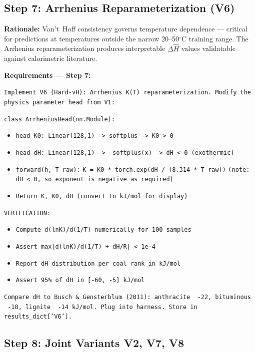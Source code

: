 \documentclass[12pt,a4paper]{article}
\begin{document}
\subsection{Step 7: Arrhenius Reparameterization (V6)}

\begin{rationalebox}
\textbf{Rationale:} Van't~Hoff consistency governs temperature dependence
--- critical for predictions at temperatures outside the narrow 20--50$^\circ$C
training range. The Arrhenius reparameterization produces interpretable
$\Delta\hat{H}$ values validatable against calorimetric literature.
\end{rationalebox}

\begin{promptbox}
\textbf{Requirements --- Step 7:}

\texttt{Implement V6 (Hard-vH): Arrhenius K(T) reparameterization.
Modify the physics parameter head from V1:}

\texttt{class ArrheniusHead(nn.Module):}
\begin{itemize}[noitemsep]
  \item \texttt{head\_K0: Linear(128,1) -> softplus -> K0 > 0}
  \item \texttt{head\_dH: Linear(128,1) -> -softplus(x) -> dH < 0
    (exothermic)}
  \item \texttt{forward(h, T\_raw):}
    \texttt{K = K0 * torch.exp(dH / (8.314 * T\_raw))}
    \texttt{(note: dH < 0, so exponent is negative as required)}
  \item \texttt{Return K, K0, dH (convert to kJ/mol for display)}
\end{itemize}

\texttt{VERIFICATION:}
\begin{itemize}[noitemsep]
  \item \texttt{Compute d(lnK)/d(1/T) numerically for 100 samples}
  \item \texttt{Assert max|d(lnK)/d(1/T) + dH/R| < 1e-4}
  \item \texttt{Report dH distribution per coal rank in kJ/mol}
  \item \texttt{Assert 95\% of dH in [-60, -5] kJ/mol}
\end{itemize}

\texttt{Compare dH to Busch \& Gensterblum (2011):
anthracite ~-22, bituminous ~-18, lignite ~-14 kJ/mol.
Plug into harness. Store in results\_dict['V6'].}
\end{promptbox}

\subsection{Step 8: Joint Variants V2, V7, V8}
\end{document}
